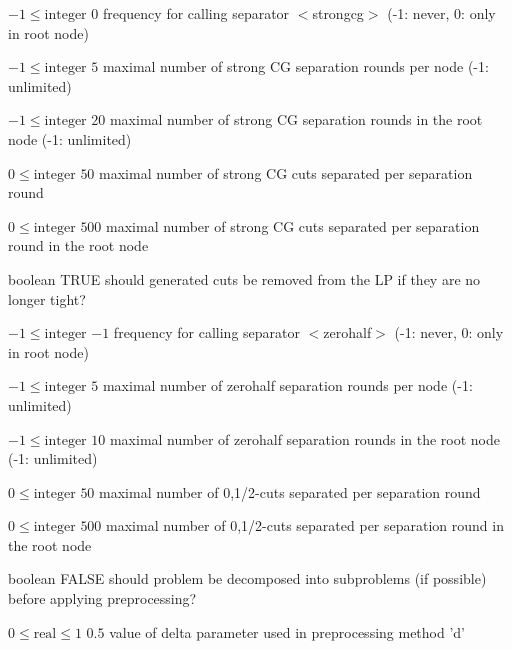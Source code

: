 %
{$-1\leq\textrm{integer}$}%
{$0$}%
{frequency for calling separator $<$strongcg$>$ (-1: never, 0: only in root node)}%
{}

%
{$-1\leq\textrm{integer}$}%
{$5$}%
{maximal number of strong CG separation rounds per node (-1: unlimited)}%
{}

%
{$-1\leq\textrm{integer}$}%
{$20$}%
{maximal number of strong CG separation rounds in the root node (-1: unlimited)}%
{}

%
{$0\leq\textrm{integer}$}%
{$50$}%
{maximal number of strong CG cuts separated per separation round}%
{}

%
{$0\leq\textrm{integer}$}%
{$500$}%
{maximal number of strong CG cuts separated per separation round in the root node}%
{}

%
{boolean}%
{TRUE}%
{should generated cuts be removed from the LP if they are no longer tight?}%
{}

%
{$-1\leq\textrm{integer}$}%
{$-1$}%
{frequency for calling separator $<$zerohalf$>$ (-1: never, 0: only in root node)}%
{}

%
{$-1\leq\textrm{integer}$}%
{$5$}%
{maximal number of zerohalf separation rounds per node (-1: unlimited)}%
{}

%
{$-1\leq\textrm{integer}$}%
{$10$}%
{maximal number of zerohalf separation rounds in the root node (-1: unlimited)}%
{}

%
{$0\leq\textrm{integer}$}%
{$50$}%
{maximal number of {0,1/2}-cuts separated per separation round}%
{}

%
{$0\leq\textrm{integer}$}%
{$500$}%
{maximal number of {0,1/2}-cuts separated per separation round in the root node}%
{}

%
{boolean}%
{FALSE}%
{should problem be decomposed into subproblems (if possible) before applying preprocessing?}%
{}

%
{$0\leq\textrm{real}\leq1$}%
{$0.5$}%
{value of delta parameter used in preprocessing method 'd'}%
{}

